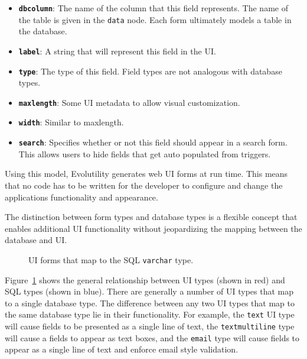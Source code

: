 \documentclass[journal]{IEEEtran}
\begin{document}
\begin{itemize}
\item \textbf{\texttt{dbcolumn}}: The name of the column that this field represents. The name of the table is given in the \texttt{data} node. Each form ultimately models a table in the database.
\item \textbf{\texttt{label}}: A string that will represent this field in the UI.
\item \textbf{\texttt{type}}: The type of this field. Field types are not analogous with database types.
\item \textbf{\texttt{maxlength}}: Some UI metadata to allow visual customization. 
\item \textbf{\texttt{width}}: Similar to maxlength.
\item \textbf{\texttt{search}}: Specifies whether or not this field should appear in a search form. This allows users to hide fields that get auto populated from triggers.
\end{itemize}

Using this model, Evolutility generates web UI forms at run time. This means that no code has to be written for the developer to configure and change the applications functionality and appearance. 

The distinction between form types and database types is a flexible concept that enables additional UI functionality without jeopardizing the mapping between the database and UI. 


\begin{figure}[h!]
\centering
{}
\caption{UI forms that map to the SQL \texttt{varchar} type.}
\label{fig:varchar_map}
\end{figure}

Figure~\ref{fig:varchar_map} shows the general relationship between UI types (shown in red) and SQL types (shown in blue). There are generally a number of UI types that map to a single database type. The difference between any two UI types that map to the same database type lie in their functionality. For example, the \texttt{text} UI type will cause fields to be presented as a single line of text, the \texttt{textmultiline} type will cause a fields to appear as text boxes, and the \texttt{email} type will cause fields to appear as a single line of text and enforce email style validation. 
\end{document}
